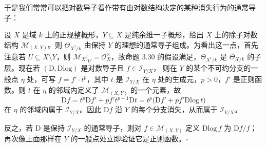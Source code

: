 于是我们常常可以把对数导子看作带有由对数结构决定的某种消失行为的通常导子：

\begin{example}
设 $X$ 是域 $k$ 上的正规整概形，$Y\subseteq X$ 是纯余维一子概形，给出 $X$ 上的除子对数结构 $\mathcal{M}_{(X,Y)}$。则 $\Theta_{X^{\dagger}/k}$ 由保持 $Y$ 的理想的通常导子组成。为看出这一点，首先注意若 $U\subseteq X\setminus Y$，则 $\mathcal{M}_X|_U=\mathcal{O}_X^{\times}$，故命题 3.30 的假设满足，$\Theta_{X^{\dagger}/k}$ 是 $\Theta_{X/k}$ 的子层。现在若 $(\mathrm{D},\mathrm{Dlog})$ 是对数导子且 $f\in\mathcal{I}_{Y/X}$，
则在 $Y$ 的某个不可约分支的一般点 $\eta$ 处，可写 $f=f'\cdot t^p$，其中 $t$ 是 $\mathcal{I}_{Y/X}$ 在 $\eta$ 处的生成元，$p>0$，$f'$ 是正则函数。则 $t$ 在 $\eta$ 的邻域内定义了 $\mathcal{M}_{(X,Y)}$ 的一个元素，故
\[
  \mathrm{D}f=t^p\mathrm{D}f'+pf't^{p-1}\mathrm{D}t
  =t^p\bigl(\mathrm{D}f'+pf'\mathrm{Dlog}\,t\bigr)
\]
在 $\eta$ 的邻域内属于 $\mathcal{I}_{Y/X}$。因此 $\mathrm{D}f$ 沿 $Y$ 的每个分支消失，从而属于 $\mathcal{I}_{Y/X}$。

反之，若 $\mathrm{D}$ 是保持 $\mathcal{I}_{Y/X}$ 的通常导子，则对 $f\in\mathcal{M}_{(X,Y)}$ 定义 $\mathrm{Dlog}\,f$ 为 $\mathrm{D}f/f$；再次像上面那样在 $Y$ 的一般点处立即验证它是正则函数。\hfill$\square$
\end{example}

